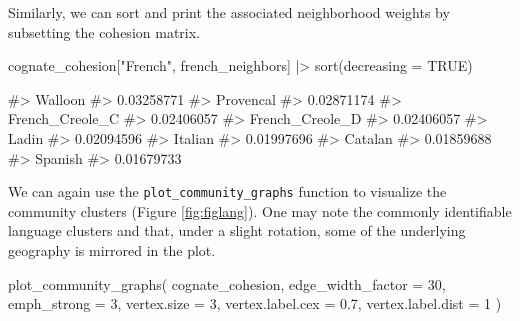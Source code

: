 Similarly, we can sort and print the associated neighborhood weights by
subsetting the cohesion matrix.

\begin{Schunk}
\begin{Sinput}
cognate_cohesion["French", french_neighbors] |>
  sort(decreasing = TRUE)
\end{Sinput}
\begin{Soutput}
#>         Walloon 
#>      0.03258771 
#>       Provencal 
#>      0.02871174 
#> French_Creole_C 
#>      0.02406057 
#> French_Creole_D 
#>      0.02406057 
#>           Ladin 
#>      0.02094596 
#>         Italian 
#>      0.01997696 
#>         Catalan 
#>      0.01859688 
#>         Spanish 
#>      0.01679733
\end{Soutput}
\end{Schunk}

We can again use the \texttt{plot\_community\_graphs} function to
visualize the community clusters (Figure \ref{fig:figlang}). One may
note the commonly identifiable language clusters and that, under a
slight rotation, some of the underlying geography is mirrored in the
plot.

\begin{Schunk}
\begin{Sinput}
plot_community_graphs(
  cognate_cohesion,
  edge_width_factor = 30,
  emph_strong = 3,
  vertex.size = 3,
  vertex.label.cex = 0.7,
  vertex.label.dist = 1
)
\end{Sinput}
\end{Schunk}

